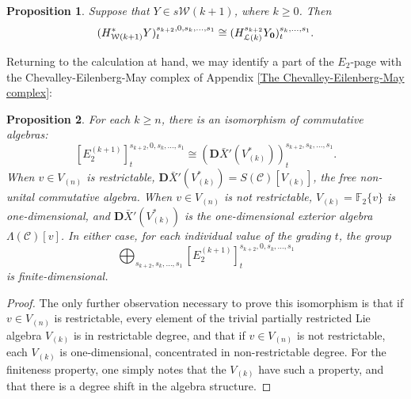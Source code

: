 \documentclass[11pt]{amsart} \renewcommand{\baselinestretch}{1.4}
\theoremstyle{plain}
\newtheorem{thm}{Theorem}[section]
\newtheorem{prop}[thm]{Proposition}
\theoremstyle{definition}
\renewcommand{\to}{\longrightarrow}
\newcommand{\scrC}{\mathscr{C}}
\newcommand{\calL}{\mathcal{L}}
\newcommand{\calw}{\mathcal{W}}
\newcommand{\calMv}{\mathcal{M}\dver}
\newcommand{\calMh}{\mathcal{M}\dhor}
\newcommand{\CommOperad}{{\scrC}}
\newcommand{\UEAX}{\bar{X}'}%
\newcommand{\F}{\mathbb{F}}
\newcommand{\Ftwo}{\F_2}
\newcommand{\E}[5]{[E^{#1}_{#2}#3]^{#4}_{#5}}
\newcommand{\dver}{_\mathrm{v}}
\newcommand{\dhor}{_\mathrm{h}}
\newcommand{\dual}{\mathbf{D}}
\begin{document}
\begin{Calculations of HWn for n nonzero}
\begin{prop}
Suppose that $Y\in s\calw(k+1)$, where $k\geq0$. Then
\[(H^*_{\calw(k+1)}Y)^{s_{k+2},0,s_k,\ldots,s_1}_{t}\cong (H^{s_{k+2}}_{\calL(k)}Y_\textup{\textbf{0}})^{s_k,\ldots,s_1}_t.\]
\end{prop}
Returning to the calculation at hand, we may identify a part of the $E_2$-page with the Chevalley-Eilenberg-May complex of Appendix \ref{The Chevalley-Eilenberg-May complex}:
\begin{prop}
\label{calculation in internal dimension zero}
For each $k\geq n$, there is an isomorphism of commutative algebras:
\[\E{(k+1)}{2}{}{s_{k+2},0,s_k,\ldots,s_1}{t} \cong(\dual\UEAX(V^*_{(k)}))^{s_{k+2},s_k,\ldots,s_1}_t.\]
When $v\in V_{(n)}$ is restrictable,  $\dual\UEAX(V^*_{(k)})=S(\CommOperad)[V_{(k)}]$, the free non-unital commutative algebra. When $v\in V_{(n)}$ is not restrictable, $V_{(k)}=\Ftwo\{v\}$ is one-dimensional, and $\dual\UEAX(V^*_{(k)})$ is the one-dimensional exterior algebra $\Lambda(\CommOperad)[v]$. In either case, for each individual value of the grading $t$, the group \[\bigoplus_{s_{k+2},s_k,\ldots,s_1}\E{(k+1)}{2}{}{s_{k+2},0,s_k,\ldots,s_1}{t}\] is finite-dimensional.
\end{prop}
\begin{proof}
The only further observation necessary to prove this isomorphism is that if $v\in V_{(n)}$ is restrictable, every element of the trivial partially restricted Lie algebra $V_{(k)}$ is in restrictable degree, and that if $v\in V_{(n)}$ is not restrictable, each $V_{(k)}$ is one-dimensional, concentrated in non-restrictable degree. For the finiteness property, one simply notes that the $V_{(k)}$ have such a property, and that there is a degree shift in the algebra structure.
\end{proof}


\end{Calculations of HWn for n nonzero}
\end{document}
